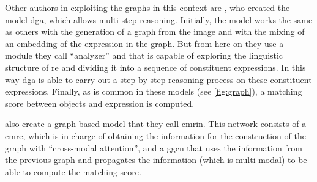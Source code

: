 Other authors in exploiting the graphs in this context are
, who created the model \gls{dga}, which allows multi-step
reasoning. Initially, the model works the same as others with the generation of
a graph from the image and with the mixing of an embedding of the expression in
the graph. But from here on they use a module they call ``analyzer'' and that
is capable of exploring the linguistic structure of \gls{re} and dividing it
into a sequence of constituent expressions. In this way \gls{dga} is able to
carry out a step-by-step reasoning process on these constituent
expressions. Finally, as is common in these models (see \vref{fig:graph}), a
matching score between objects and expression is computed.

 also create a
graph-based model that they call \gls{cmrin}. This network consists of a
\gls{cmre}, which is in charge of obtaining the information for the
construction of the graph with ``cross-modal attention'', and a \gls{ggcn} that
uses the information from the previous graph and propagates the information
(which is multi-modal) to be able to compute the matching score.
